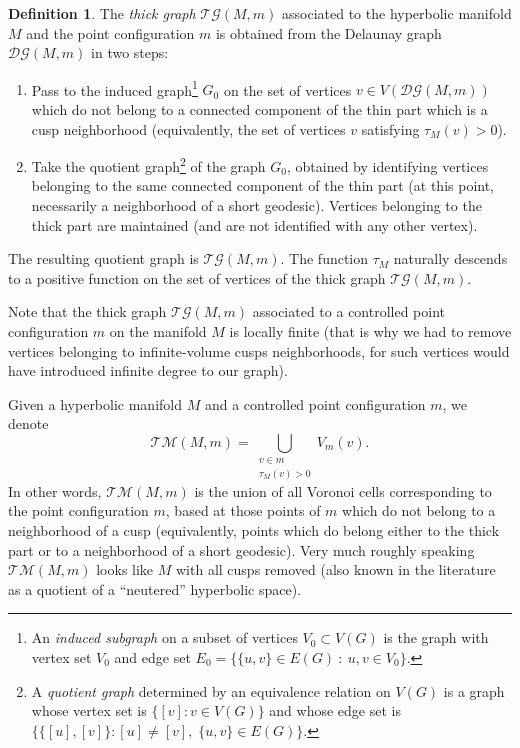 \documentclass{amsart}
\newcommand{\DelanGraph}{\mathcal{DG}}
\newcommand{\ThickGraph}{\mathcal{TG}}
\newcommand{\ThickManifold}[2]{\mathcal{TM}(#1,#2)}
\theoremstyle{plain}
\numberwithin{equation}{section}
\theoremstyle{definition}
\newtheorem{definition}[theorem]{Definition}
\begin{document}
\begin{definition}
\label{def:thick graph}
The \emph{thick graph} $\ThickGraph(M,m)$ associated to the hyperbolic manifold $M$ and the point configuration $m$ is obtained from the Delaunay graph $ \DelanGraph(M,m)$ in two steps:
\begin{enumerate}
    \item Pass to the induced graph\footnote{An \emph{induced subgraph}  on a subset of vertices $V_0 \subset V(G)$ is the graph with vertex set $V_0$ and edge set $E_0 = \{ \{u,v\} \in E(G) \: :\:u,v \in V_0\}$.} $G_0$ on the set of vertices $v \in V(\DelanGraph(M,m))$ which do not belong to a connected component of the thin part which is a cusp neighborhood (equivalently, the set of vertices $v$ satisfying $\tau_M(v) > 0$).
    \item Take the quotient graph\footnote{A \emph{quotient graph} determined by an equivalence relation on $V(G)$ is a graph whose vertex set is $ \{\left[v\right] : v \in V(G)\}$ and whose edge set is $\{ \{\left[u\right],\left[v\right]\} : \left[u\right] \neq \left[v\right] ,\;\{u,v\}\in E(G)\}$.} of the  graph $G_0$, obtained by identifying vertices belonging to the same connected component of the thin part (at this point, necessarily a neighborhood of a short geodesic). Vertices belonging to the thick part are maintained (and are not identified with any other vertex).
\end{enumerate}
The resulting quotient graph is $\ThickGraph(M,m)$. 
The function $\tau_M$ naturally descends to a positive function on the set of vertices of the thick graph $\ThickGraph(M,m)$. 
\end{definition}

Note that the thick graph $\ThickGraph(M,m)$ associated to a controlled point configuration $m$ on the manifold $M$ is locally finite (that is why we had to remove vertices belonging to infinite-volume cusps neighborhoods, for such vertices would have introduced infinite degree to our graph).

Given a hyperbolic manifold $M$ and a controlled point configuration $m$, we denote
$$ \ThickManifold{M}{m}= \bigcup_{\substack{v \in m\\ \tau_M(v) > 0 }} V_m(v).$$
In other words,  $\ThickManifold{M}{m}$ is the union of all Voronoi cells corresponding to the point configuration $m$, based at those points of $m$ which do not belong to a neighborhood of a cusp (equivalently, points which do belong either to the thick part or to a neighborhood of a short geodesic). Very much roughly  speaking  $\ThickManifold{M}{m}$ looks like $M$ with all cusps removed (also known in the literature as a quotient of a \enquote{neutered} hyperbolic space). 
\end{document}
